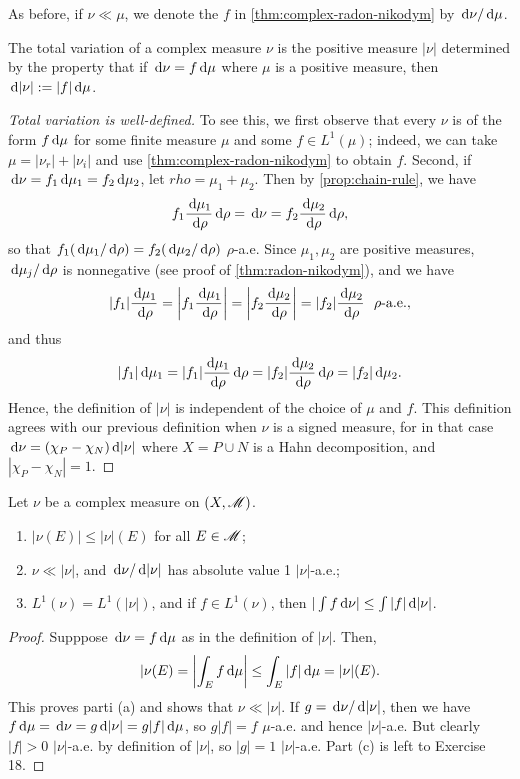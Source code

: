 \documentclass[12pt]{article} %
\begin{document}
\noindent As before, if $\nu \ll \mu$, we denote the $f$ in \cref{thm:complex-radon-nikodym} by $\, \mathrm{d}\nu / \, \mathrm{d}\mu$.

\begin{definition}
    The total variation of a complex measure $\nu$ is the positive measure $|\nu|$ determined by the property that if $\, \mathrm{d}\nu = f\, \mathrm{d}\mu$ where $\mu$ is a positive measure, then $\, \mathrm{d}|\nu| := |f|\, \mathrm{d}\mu$. 
\end{definition}

\begin{proof}[Total variation is well-defined]
    To see this, we first observe that every $\nu$ is of the form $f \, \mathrm{d}\mu$ for some finite measure $\mu$ and some $f \in L^1(\mu)$; indeed, we can take $\mu = |\nu_r| + |\nu_i|$ and use \cref{thm:complex-radon-nikodym} to obtain $f$. Second, if $\, \mathrm{d}\nu = f_1\, \mathrm{d}\mu_1 = f_2\, \mathrm{d}\mu_2$, let $rho = \mu_1 + \mu_2$. Then by \cref{prop:chain-rule}, we have \[f_1 \frac{\, \mathrm{d}\mu_1}{\, \mathrm{d}\rho}\, \mathrm{d}\rho = \, \mathrm{d}\nu = f_2 \frac{\, \mathrm{d}\mu_2}{\, \mathrm{d}\rho}\, \mathrm{d}\rho,\] so that $f_1(\, \mathrm{d}\mu_1/\, \mathrm{d}\rho) = f_2(\, \mathrm{d}\mu_2/\, \mathrm{d}\rho)$ $\rho$-a.e. Since $\mu_1, \mu_2$ are positive measures, $\, \mathrm{d}\mu_j / \, \mathrm{d}\rho$ is nonnegative (see proof of \cref{thm:radon-nikodym}), and we have \[|f_1| \frac{\, \mathrm{d}\mu_1}{\, \mathrm{d}\rho} = \left|f_1 \frac{\, \mathrm{d}\mu_1}{\, \mathrm{d}\rho} \right| = \left|f_2 \frac{\, \mathrm{d}\mu_2}{\, \mathrm{d}\rho}\right| = |f_2|\frac{\, \mathrm{d}\mu_2}{\, \mathrm{d}\rho} \ \ \rho\text{-a.e.},\] and thus \[|f_1|\, \mathrm{d}\mu_1 = |f_1|\frac{\, \mathrm{d}\mu_1}{\, \mathrm{d}\rho}\, \mathrm{d}\rho = |f_2|\frac{\, \mathrm{d}\mu_2}{\, \mathrm{d}\rho}\, \mathrm{d}\rho = |f_2|\, \mathrm{d}\mu_2.\] Hence, the definition of $|\nu|$ is independent of the choice of $\mu$ and $f$. This definition agrees with our previous definition when $\nu$ is a signed measure, for in that case $\, \mathrm{d}\nu = (\chi_P - \chi_N)\, \mathrm{d}|\nu|$ where $X = P \cup N$ is a Hahn decomposition, and $|\chi_P - \chi_N| = 1$.
\end{proof}

\begin{proposition}
    Let $\nu$ be a complex measure on $(X, \mathscr{M})$. \begin{enumerate}
        \item $|\nu(E)| \leq |\nu|(E)$ for all $E \in \mathscr{M}$;
        \item $\nu \ll |\nu|$, and $\, \mathrm{d}\nu / \, \mathrm{d}|\nu|$ has absolute value 1 $|\nu|$-a.e.;
        \item $L^1(\nu) = L^1(|\nu|)$, and if $f \in L^1(\nu)$, then $|\int f \, \mathrm{d}\nu| \leq \int |f|\, \mathrm{d}|\nu|$.
    \end{enumerate}
\end{proposition}

\begin{proof}
    Supppose $\, \mathrm{d}\nu = f\, \mathrm{d}\mu$ as in the definition of $|\nu|$. Then, \[|\nu(E) = \left|\int_E f \, \mathrm{d}\mu \right| \leq \int_E |f| \, \mathrm{d}\mu = |\nu|(E).\] This proves parti (a) and shows that $\nu \ll |\nu|$. If $g = \, \mathrm{d}\nu / \, \mathrm{d}|\nu|$, then we have $f \, \mathrm{d}\mu = \, \mathrm{d}\nu = g \, \mathrm{d}|\nu| = g |f| \, \mathrm{d}\mu$, so $g|f| = f$ $\mu$-a.e. and hence $|\nu|$-a.e. But clearly $|f| > 0$ $|\nu|$-a.e. by definition of $|\nu|$, so $|g| = 1$ $|\nu|$-a.e. Part (c) is left to Exercise 18. 
\end{proof}
\end{document}
